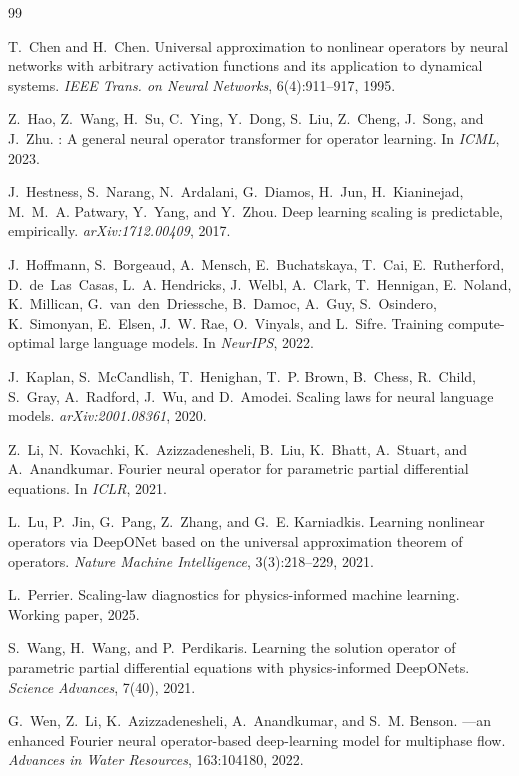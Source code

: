 \documentclass[11pt]{article}
\begin{document}
\begin{thebibliography}{99}

T.~Chen and H.~Chen.
\newblock Universal approximation to nonlinear operators by neural networks
  with arbitrary activation functions and its application to dynamical systems.
\newblock \emph{IEEE Trans. on Neural Networks}, 6(4):911--917, 1995.

Z.~Hao, Z.~Wang, H.~Su, C.~Ying, Y.~Dong, S.~Liu, Z.~Cheng, J.~Song, and
  J.~Zhu.
: A general neural operator transformer for operator learning.
\newblock In \emph{ICML}, 2023.

J.~Hestness, S.~Narang, N.~Ardalani, G.~Diamos, H.~Jun, H.~Kianinejad,
  M.~M.~A. Patwary, Y.~Yang, and Y.~Zhou.
\newblock Deep learning scaling is predictable, empirically.
\newblock \emph{arXiv:1712.00409}, 2017.

J.~Hoffmann, S.~Borgeaud, A.~Mensch, E.~Buchatskaya, T.~Cai, E.~Rutherford,
  D.~de~Las~Casas, L.~A. Hendricks, J.~Welbl, A.~Clark, T.~Hennigan,
  E.~Noland, K.~Millican, G.~van~den~Driessche, B.~Damoc, A.~Guy,
  S.~Osindero, K.~Simonyan, E.~Elsen, J.~W. Rae, O.~Vinyals, and
  L.~Sifre.
\newblock Training compute-optimal large language models.
\newblock In \emph{NeurIPS}, 2022.

J.~Kaplan, S.~McCandlish, T.~Henighan, T.~P. Brown, B.~Chess, R.~Child,
  S.~Gray, A.~Radford, J.~Wu, and D.~Amodei.
\newblock Scaling laws for neural language models.
\newblock \emph{arXiv:2001.08361}, 2020.

Z.~Li, N.~Kovachki, K.~Azizzadenesheli, B.~Liu, K.~Bhatt, A.~Stuart, and
  A.~Anandkumar.
\newblock Fourier neural operator for parametric partial differential equations.
\newblock In \emph{ICLR}, 2021.

L.~Lu, P.~Jin, G.~Pang, Z.~Zhang, and G.~E. Karniadkis.
\newblock Learning nonlinear operators via {DeepONet} based on the universal
  approximation theorem of operators.
\newblock \emph{Nature Machine Intelligence}, 3(3):218--229, 2021.

L.~Perrier.
\newblock Scaling-law diagnostics for physics-informed machine learning.
\newblock Working paper, 2025.

S.~Wang, H.~Wang, and P.~Perdikaris.
\newblock Learning the solution operator of parametric partial differential
  equations with physics-informed {DeepONets}.
\newblock \emph{Science Advances}, 7(40), 2021.

G.~Wen, Z.~Li, K.~Azizzadenesheli, A.~Anandkumar, and S.~M. Benson.
---an enhanced {Fourier} neural operator-based deep-learning
  model for multiphase flow.
\newblock \emph{Advances in Water Resources}, 163:104180, 2022.

\end{thebibliography}
\end{document}
